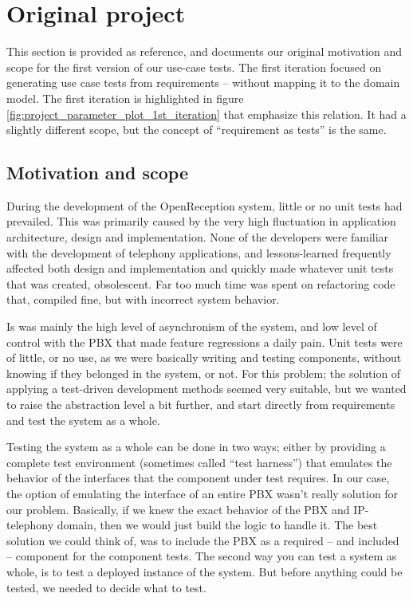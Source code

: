 \section{Original project}
This section is provided as reference, and documents our original motivation and scope for the first version of our use-case tests. The first iteration focused on generating use case tests from requirements -- without mapping it to the domain model. The first iteration is highlighted in figure \ref{fig:project_parameter_plot_1st_iteration} that emphasize this relation.
It had a slightly different scope, but the concept of ``requirement as tests'' is the same.
\subsection{Motivation and scope}
During the development of the OpenReception system, little or no unit tests had prevailed. This  was primarily caused by the very high fluctuation in application architecture, design and implementation. None of the developers were familiar with the development of telephony applications, and lessons-learned frequently affected both design and implementation and quickly made whatever unit tests that was created, obsolescent. Far too much time was spent on refactoring code that, compiled fine, but with incorrect system behavior.\medskip

\noindent Is was mainly the high level of asynchronism of the system, and low level of control with the PBX that made feature regressions a daily pain. Unit tests were of little, or no use, as we were basically writing and testing components, without knowing if they belonged in the system, or not. For this problem; the solution of applying a test-driven development methods seemed very suitable, but we wanted to raise the abstraction level a bit further, and start directly from requirements and test the system as a whole.\medskip

\noindent Testing the system as a whole can be done in two ways; either by providing a complete test environment (sometimes called ``test harness'') that emulates the behavior of the interfaces that the component under test requires. In our case, the option of emulating the interface of an entire PBX wasn't really solution for our problem. Basically, if we knew the exact behavior of the PBX and IP-telephony domain, then we would just build the logic to handle it. The best solution we could think of, was to include the PBX as a required -- and included -- component for the component tests.
The second way you can test a system as whole, is to test a deployed instance of the system. But before anything could be tested, we needed to decide what to test.

